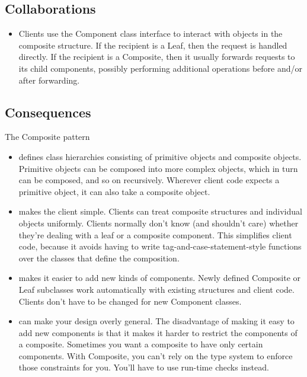 \subsection*{Collaborations}

\begin{itemize}
    \item Clients use the Component class interface to interact with objects in the composite structure. If the recipient is a Leaf, then the request is handled directly. If the recipient is a Composite, then it usually forwards requests to its child components, possibly performing additional operations before and/or after forwarding.
\end{itemize}

\subsection*{Consequences}

The Composite pattern
\begin{itemize}
    \item defines class hierarchies consisting of primitive objects and composite objects. Primitive objects can be composed into more complex objects, which in turn can be composed, and so on recursively. Wherever client code expects a primitive object, it can also take a composite object.
    \item makes the client simple. Clients can treat composite structures and individual objects uniformly. Clients normally don't know (and shouldn't care) whether they're dealing with a leaf or a composite component. This simplifies client code, because it avoids having to write tag-and-case-statement-style functions over the classes that define the composition.
    \item makes it easier to add new kinds of components. Newly defined Composite or Leaf subclasses work automatically with existing structures and client code. Clients don't have to be changed for new Component classes.
    \item can make your design overly general. The disadvantage of making it easy to add new components is that it makes it harder to restrict the components of a composite. Sometimes you want a composite to have only certain components. With Composite, you can't rely on the type system to enforce those constraints for you. You'll have to use run-time checks instead.
\end{itemize}

